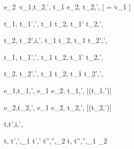   {e_2\ v_1,\sigma \normalise t_2,\sigma',\phi}
  {t_1 \Next e_2,\sigma \handle{\Continue} t_2,\sigma',\phi}
  [ = v_1 \land \neg{}]


  {t_1,\sigma {} t_1',\sigma',\phi}
  {t_1 \And t_2,\sigma {} t_1' \And t_2,\sigma',\phi}

  {t_2,\sigma {} t_2',i,\sigma',\phi}
  {t_1 \And t_2,\sigma {} t_1 \And t_2',\sigma',\phi}


  {t_1,\sigma {} t_1',\sigma',\phi}
  {t_1 \Or t_2,\sigma {} t_1' \Or t_2,\sigma',\phi}

  {t_2,\sigma {} t_2',\sigma',\phi }
  {t_1 \Or t_2,\sigma {} t_1 \Or t_2',\sigma',\phi}


  {e_1,\sigma \normalise t_1,\sigma',\phi}
  {e_1 \Xor e_2,\sigma \handle{\Left} t_1,\sigma',\phi}
  [\neg\Failing(t_1,\sigma')]

  {e_2,\sigma \normalise t_2,\sigma',\phi}
  {e_1 \Xor e_2,\sigma \handle{\Right} t_2,\sigma',\phi}
  [\neg\Failing(t_2,\sigma')]





  {t,\sigma \drive t',i,\sigma',\phi}


  {t,\sigma {} t',\sigma',\phi_1 \Quad
   t',\sigma' \normalise t'',\sigma'',\phi_2}
  {t,\sigma {} t'',\sigma'',\phi_1 \land \phi_2}
